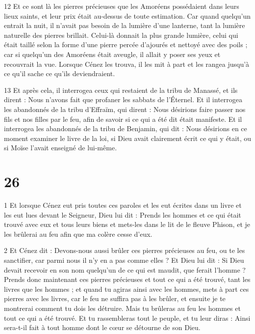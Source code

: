 \par 12 Et ce sont là les pierres précieuses que les Amoréens possédaient dans leurs lieux saints, et leur prix était au-dessus de toute estimation. Car quand quelqu'un entrait la nuit, il n'avait pas besoin de la lumière d'une lanterne, tant la lumière naturelle des pierres brillait. Celui-là donnait la plus grande lumière, celui qui était taillé selon la forme d'une pierre percée d'ajourés et nettoyé avec des poils ; car si quelqu'un des Amoréens était aveugle, il allait y poser ses yeux et recouvrait la vue. Lorsque Cénez les trouva, il les mit à part et les rangea jusqu'à ce qu'il sache ce qu'ils deviendraient.

\par 13 Et après cela, il interrogea ceux qui restaient de la tribu de Manassé, et ils dirent : Nous n'avons fait que profaner les sabbats de l'Éternel. Et il interrogea les abandonnés de la tribu d'Effraïm, qui dirent : Nous désirions faire passer nos fils et nos filles par le feu, afin de savoir si ce qui a été dit était manifeste. Et il interrogea les abandonnés de la tribu de Benjamin, qui dit : Nous désirions en ce moment examiner le livre de la loi, si Dieu avait clairement écrit ce qui y était, ou si Moïse l'avait enseigné de lui-même.

\chapter{26}

\par 1 Et lorsque Cénez eut pris toutes ces paroles et les eut écrites dans un livre et les eut lues devant le Seigneur, Dieu lui dit : Prends les hommes et ce qui était trouvé avec eux et tous leurs biens et mets-les dans le lit de le fleuve Phison, et je les brûlerai au feu afin que ma colère cesse d'eux.

\par 2 Et Cénez dit : Devons-nous aussi brûler ces pierres précieuses au feu, ou te les sanctifier, car parmi nous il n'y en a pas comme elles ? Et Dieu lui dit : Si Dieu devait recevoir en son nom quelqu'un de ce qui est maudit, que ferait l'homme ? Prends donc maintenant ces pierres précieuses et tout ce qui a été trouvé, tant les livres que les hommes ; et quand tu agiras ainsi avec les hommes, mets à part ces pierres avec les livres, car le feu ne suffira pas à les brûler, et ensuite je te montrerai comment tu dois les détruire. Mais tu brûleras au feu les hommes et tout ce qui a été trouvé. Et tu rassembleras tout le peuple, et tu leur diras : Ainsi sera-t-il fait à tout homme dont le cœur se détourne de son Dieu.

